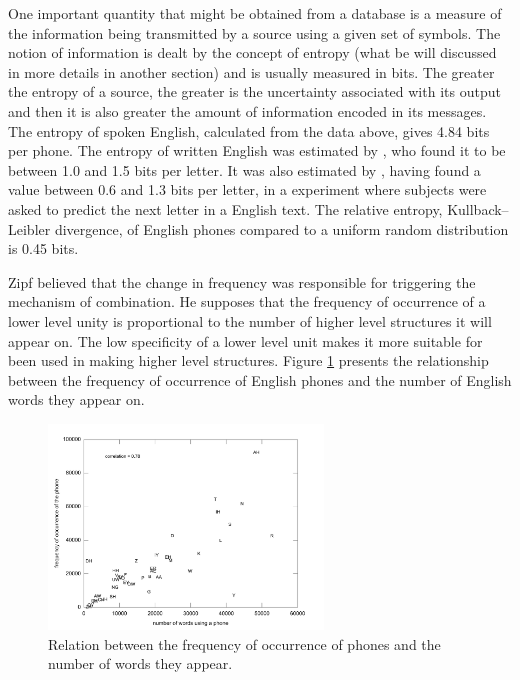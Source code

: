 One important quantity that might be obtained from a database is a measure of the information
being transmitted by a source using a given set of symbols. The notion of information
is dealt by the concept of entropy (what be will discussed in more details in another section)
and is usually measured in bits. The greater the entropy of a source, the greater is the 
uncertainty associated with its output and then it is also greater the amount of information encoded
in its messages.
The entropy of spoken English, calculated from the data above, gives 4.84 bits per phone.
The entropy of written English was estimated by \citep{schneier1996}, who found it
to be between 1.0 and 1.5 bits per letter. %
It was also estimated by \cite{shannon1951}, having found a value between 0.6 and 1.3 bits per letter,
in a experiment where subjects were asked to predict
the next letter in a English text. 
The relative entropy, Kullback–Leibler divergence, of English 
phones compared to a uniform random distribution is 0.45 bits.

Zipf believed that the change in frequency was responsible for triggering the 
mechanism of combination. He supposes that the frequency of occurrence of a
lower level unity is proportional to the number of higher level structures 
it will appear on. The low specificity of a lower level unit
makes it more suitable for been used in making higher level structures.
Figure \ref{fig:phones_num_words_freq_occ} presents the relationship
between the frequency of occurrence of English phones and the number
of English words they appear on. 

\begin{figure}[h!]
\centering
\includegraphics[width=0.65\textwidth]{images/phones_num_words_freq_occ.pdf}
\caption{Relation between the frequency of occurrence of phones and the number of words they appear.}
\label{fig:phones_num_words_freq_occ}
\end{figure} 

